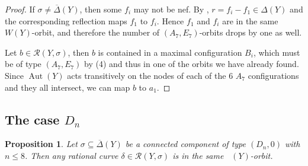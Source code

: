 \documentclass[a4paper]{amsart}
\theoremstyle{definition}
\theoremstyle{plain}
\newtheorem{proposition}[definition]{Proposition}
\DeclareMathOperator{\Aut}{Aut}
\DeclareMathOperator{\aut}{Aut^*}
\newcommand{\R}{\mathcal{R}}
\newcommand{\DeltabarY}{\overline{\Delta}(Y)}
\begin{document}
\begin{proof}
If $\sigma \neq \DeltabarY$, then some $f_i$ may not be nef. By , $r= f_i - f_1 \in \Delta(Y)$ and the corresponding reflection maps $f_1$ to $f_i$. Hence $f_1$ and $f_i$ are in the same $W(Y)$-orbit, and therefore the number of $(A_7,E_7)$-orbits drops by one as well. 

Let $b \in \R(Y,\sigma)$, then $b$ is contained in a maximal configuration $B_i$, which must be of type $(A_7,E_7)$ by  (4) and thus in one of the orbits we have already found. 
Since $\Aut(Y)$ acts transitively on the nodes of each of the $6$ $A_7$ configurations and they all intersect, we can map $b$ to $a_1$.
\end{proof}

\subsection{The case $D_n$}
\begin{proposition}\label{lemma:Dn-transitive}
Let $\sigma \subseteq \DeltabarY$ be a connected component of type $(D_n, 0)$ with $n \leq 8$.
Then any rational curve $\delta \in \R(Y,\sigma)$ is in the same $\aut(Y)$-orbit.
\end{proposition}
\end{document}
